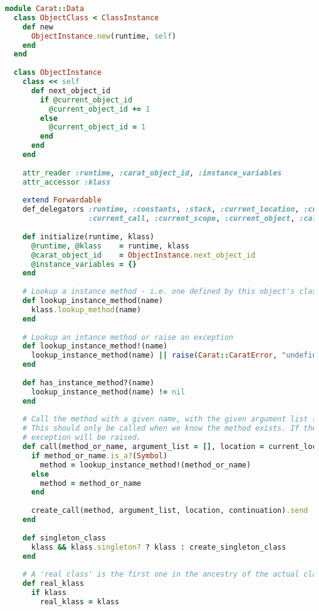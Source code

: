 \begin{lstlisting}[title={\small\Helvetica data/object.rb},language=Ruby]
module Carat::Data
  class ObjectClass < ClassInstance
    def new
      ObjectInstance.new(runtime, self)
    end
  end
  
  class ObjectInstance
    class << self
      def next_object_id
        if @current_object_id
          @current_object_id += 1
        else
          @current_object_id = 1
        end
      end
    end
    
    attr_reader :runtime, :carat_object_id, :instance_variables
    attr_accessor :klass
    
    extend Forwardable
    def_delegators :runtime, :constants, :stack, :current_location, :current_failure_continuation,
                   :current_call, :current_scope, :current_object, :call_stack
    
    def initialize(runtime, klass)
      @runtime, @klass    = runtime, klass
      @carat_object_id    = ObjectInstance.next_object_id
      @instance_variables = {}
    end
    
    # Lookup a instance method - i.e. one defined by this object's class
    def lookup_instance_method(name)
      klass.lookup_method(name)
    end
    
    # Lookup an intance method or raise an exception
    def lookup_instance_method!(name)
      lookup_instance_method(name) || raise(Carat::CaratError, "undefined method '#{name}'")
    end
    
    def has_instance_method?(name)
      lookup_instance_method(name) != nil
    end
    
    # Call the method with a given name, with the given argument list (AST::ArgumentList or Array).
    # This should only be called when we know the method exists. If the method does not exist an
    # exception will be raised.
    def call(method_or_name, argument_list = [], location = current_location, &continuation)
      if method_or_name.is_a?(Symbol)
        method = lookup_instance_method!(method_or_name)
      else
        method = method_or_name
      end
      
      create_call(method, argument_list, location, continuation).send
    end
    
    def singleton_class
      klass && klass.singleton? ? klass : create_singleton_class
    end
    
    # A 'real class' is the first one in the ancestry of the actual class, which is not a singleton
    def real_klass
      if klass
        real_klass = klass
        

\end{lstlisting}
